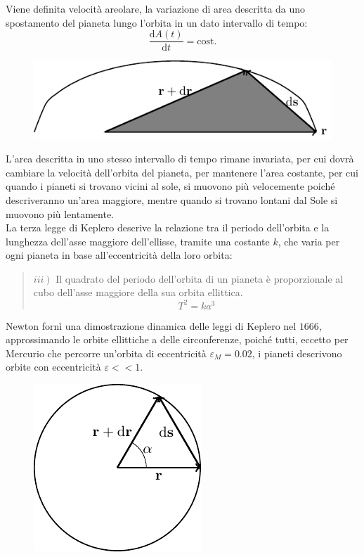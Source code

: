 \documentclass{article}
\newcommand{\df}{\mathrm{d}}
\numberwithin{equation}{subsection}
\begin{document}
Viene definita velocità areolare, la variazione di area descritta da uno spostamento del pianeta lungo l'orbita in un dato intervallo di tempo: 
\begin{equation}
    \displaystyle\frac{\df A(t)}{\df t}=\mathrm{cost.}
\end{equation}

\begin{figure}[H]%
    \centering
    \includegraphics{seconda-keplero.pdf}%
\end{figure}

L'area descritta in uno stesso intervallo di tempo rimane invariata, per cui dovrà cambiare la velocità dell'orbita del pianeta, per mantenere l'area 
costante, per cui quando i pianeti si trovano vicini al sole, si muovono più velocemente poiché descriveranno un'area maggiore, mentre quando si 
trovano lontani dal Sole si muovono più lentamente. 
\\
La terza legge di Keplero descrive la relazione tra il periodo dell'orbita e la lunghezza dell'asse maggiore dell'ellisse, tramite una costante 
$k$, che varia per ogni pianeta in base all'eccentricità della loro orbita: 
\begin{quotation}
    $iii\left.\right)$ Il quadrato del periodo dell'orbita di un pianeta è proporzionale al cubo dell'asse maggiore della sua orbita ellittica.
    \begin{equation}
        T^2=ka^3
    \end{equation}
\end{quotation}

Newton fornì una dimostrazione dinamica delle leggi di Keplero nel $1666$, approssimando le orbite ellittiche a delle circonferenze, poiché 
tutti, eccetto per Mercurio che percorre un'orbita di eccentricità $\varepsilon_M=0.02$, i pianeti descrivono orbite con eccentricità $\varepsilon<<1$. 

\begin{figure}[H]%
    \centering
    \includegraphics{terza-keplero.pdf}%
\end{figure}
\end{document}

